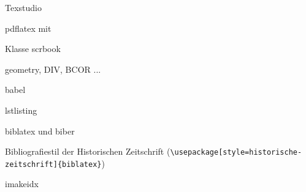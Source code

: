 


\frontmatter


\tableofcontents
\mainmatter























\printbibliography




\vfill
{}

Texstudio

pdflatex mit \KOMAScript 

Klasse scrbook

geometry, DIV,  BCOR ...

babel

lstlisting

biblatex und biber

Bibliografiestil der Historischen Zeitschrift (\lstinline/\usepackage[style=historische-zeitschrift]{biblatex}/)

imakeidx

